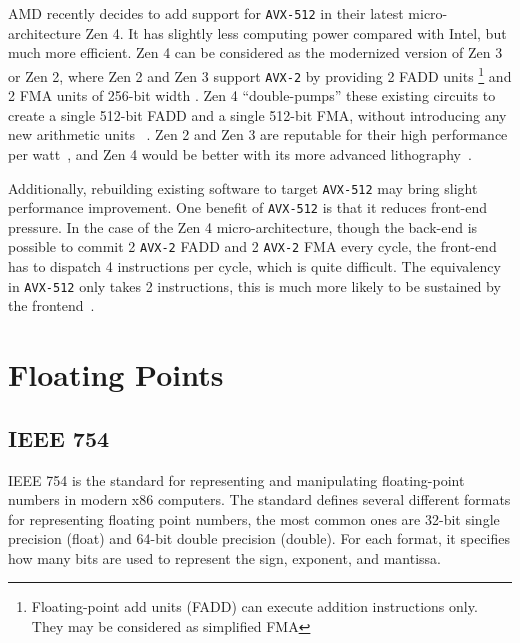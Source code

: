 \documentclass[logo,bsc,singlespacing,parskip]{infthesis}
\begin{document}
AMD recently decides to add support for \texttt{AVX-512} in their latest
micro-architecture Zen 4. It has slightly less computing power compared with
Intel, but much more efficient. Zen 4 can be considered as the modernized version of
Zen 3 or Zen 2, where Zen 2 and Zen 3 support \texttt{AVX-2}  by providing 2 FADD
units \footnote{Floating-point add units (FADD) can execute addition
instructions only. They may be considered as simplified FMA} and 2 FMA units of
256-bit width \cite{Zen2ChipWiki}. Zen 4 ``double-pumps'' these existing circuits
to create a single 512-bit FADD and a single 512-bit FMA, without introducing
any new arithmetic units ~\cite{Zen4Critique}. Zen 2 and Zen 3 are reputable for
their high performance per watt~\cite{ZenPerfPerWatt}, and Zen 4 would be better
with its more advanced lithography~\cite{Zen4Critique}.

Additionally, rebuilding existing software to target \texttt{AVX-512} may bring
slight performance improvement. One benefit of \texttt{AVX-512} is that it
reduces front-end pressure. In the case of the Zen 4 micro-architecture, though
the back-end is possible to commit 2 \texttt{AVX-2} FADD and 2 \texttt{AVX-2}
FMA every cycle, the front-end has to dispatch 4 instructions per cycle, which
is quite difficult. The equivalency in \texttt{AVX-512} only takes 2
instructions, this is much more likely to be sustained by the
frontend~\cite{Zen4Critique}.


\section{Floating Points}
\label{sec:i23}
\subsection{IEEE 754}
\label{sec:IEEE754}
IEEE 754 is the standard for representing and manipulating floating-point
numbers in modern x86 computers. The standard defines several different formats
for representing floating point numbers, the most common ones are 32-bit single
precision (float) and 64-bit double precision (double). For each format, it
specifies how many bits are used to represent the sign, exponent, and mantissa. 
\end{document}

